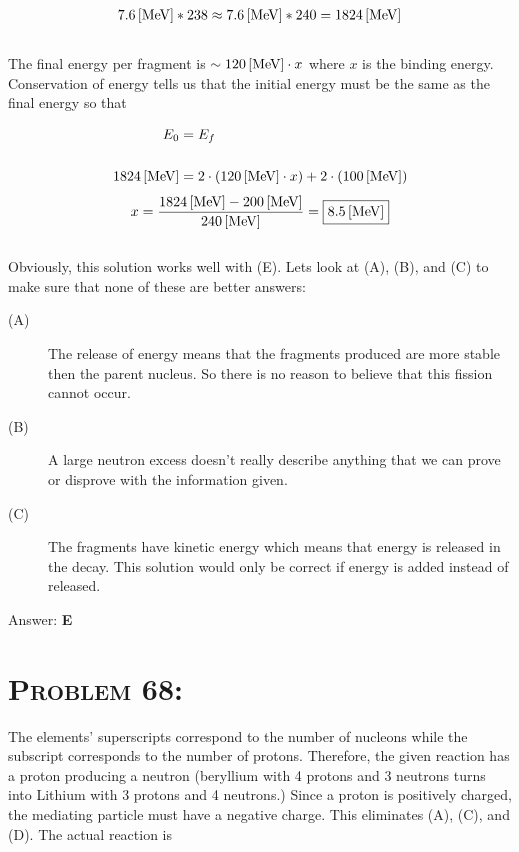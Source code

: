 \documentclass{article}
\begin{document}
\begin{gather}
\unit[7.6]{[MeV]} *238 \approx \unit[7.6]{[MeV]} *240 = \unit[1824]{[MeV]}\nonumber
\end{gather}
\\
The final energy per fragment is $\sim \unit[120]{[MeV]}\cdot x$ where $x$ is the binding energy. Conservation of energy tells us that the initial energy must be the same as the final energy so that

\begin{align}
E_{0} &= E_{f}\nonumber\\
\nonumber\\
\unit[1824]{[MeV]} &= 2 \cdot (\unit[120]{[MeV]}\cdot x)+ 2 \cdot (\unit[100]{[MeV]}) \nonumber
\end{align}
\begin{gather}
x = \frac{\unit[1824]{[MeV]} - \unit[200]{[MeV]} }{\unit[240]{[MeV]}} = \boxed{\unit[8.5]{[MeV]}}\nonumber
\end{gather}
\\
Obviously, this solution works well with (E). Lets look at (A), (B), and (C) to make sure that none of these are better answers:

\begin{description}

\item[(A)] The release of energy means that the fragments produced are more stable then the parent nucleus. So there is no reason to believe that this fission cannot occur.

\item[(B)] A large neutron excess doesn't really describe anything that we can prove or disprove with the information given.

\item[(C)] The fragments have kinetic energy which means that energy is released in the decay. This solution would only be correct if energy is added instead of released.

\end{description}
Answer: \textbf{\textcolor{ProcessBlue}E}\\


\section{\textsc{Problem 68:}} The elements' superscripts correspond to the number of nucleons while the subscript corresponds to the number of protons. Therefore, the given reaction has a proton producing a neutron (beryllium with 4 protons and 3 neutrons turns into Lithium with 3 protons and 4 neutrons.) Since a proton is positively charged, the mediating particle must have a negative charge. This eliminates (A), (C), and (D). The actual reaction is
\end{document}
